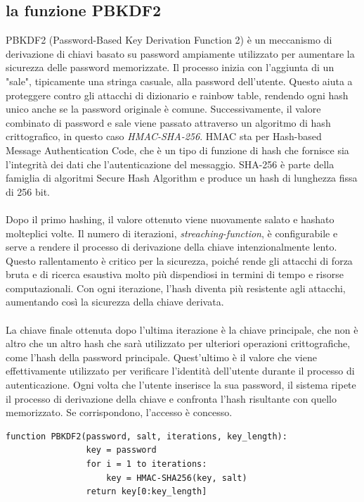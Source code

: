 \documentclass[a4paper,12pt]{report}
\begin{document}
		\subsection{la funzione PBKDF2}
		PBKDF2 (Password-Based Key Derivation Function 2) è un meccanismo di
		derivazione di chiavi basato su password ampiamente utilizzato per
		aumentare la sicurezza delle password memorizzate. Il processo inizia
		con l'aggiunta di un "sale", tipicamente una stringa casuale, alla
		password dell'utente. Questo aiuta a proteggere contro gli attacchi di
		dizionario e rainbow table, rendendo ogni hash unico anche se la
		password originale è comune. Successivamente, il valore combinato di
		password e sale viene passato attraverso un algoritmo di hash
		crittografico, in questo caso \textit{HMAC-SHA-256}. HMAC sta per Hash-based
		Message Authentication Code, che è un tipo di funzione di hash che
		fornisce sia l'integrità dei dati che l'autenticazione del messaggio.
		SHA-256 è parte della famiglia di algoritmi Secure Hash Algorithm e
		produce un hash di lunghezza fissa di 256 bit.\cite{PBKDF2}\\\\
		Dopo il primo hashing, il valore ottenuto viene nuovamente salato e hashato
		molteplici volte. Il numero di iterazioni, \textit{streaching-function}\cite{PBKDF2-streaching-function}, è
		configurabile e serve a rendere il processo di derivazione della chiave
		intenzionalmente lento. Questo rallentamento è critico per la sicurezza, poiché
		rende gli attacchi di forza bruta e di ricerca esaustiva molto più dispendiosi
		in termini di tempo e risorse computazionali. Con ogni iterazione, l'hash
		diventa più resistente agli attacchi, aumentando così la sicurezza della chiave
		derivata.\\\\
		La chiave finale ottenuta dopo l'ultima iterazione è la chiave principale, che
		non è altro che un altro hash che sarà utilizzato per ulteriori operazioni
		crittografiche, come l'hash della password principale. Quest'ultimo è il valore
		che viene effettivamente utilizzato per verificare l'identità dell'utente
		durante il processo di autenticazione. Ogni volta che l'utente inserisce la sua
		password, il sistema ripete il processo di derivazione della chiave e confronta
		l'hash risultante con quello memorizzato. Se corrispondono, l'accesso è
		concesso.
		\begin{lstlisting}[style=pseudocode]
			function PBKDF2(password, salt, iterations, key_length):
				key = password
				for i = 1 to iterations:
					key = HMAC-SHA256(key, salt)
				return key[0:key_length]
		\end{lstlisting}
\end{document}
